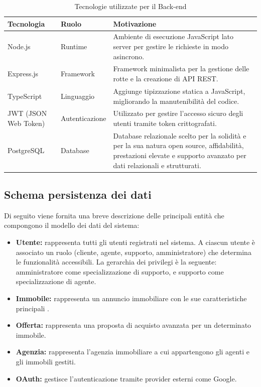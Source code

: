 \documentclass[a4paper,11pt]{article}
\renewcommand{\arraystretch}{1.18}
\begin{document}
\begin{table}[htbp]
\centering
\caption{Tecnologie utilizzate per il Back-end}
\vspace{0.5em}
\renewcommand{\arraystretch}{1.5}
\begin{tabularx}{\textwidth}{|l|l|X|}
\hline
\rowcolor[HTML]{010066} 
{\color[HTML]{EFEFEF} \textbf{Tecnologia}} & {\color[HTML]{FFFFFF} \textbf{Ruolo}} & {\color[HTML]{FFFFFF} \textbf{Motivazione}} \\ \hline

Node.js & Runtime & Ambiente di esecuzione JavaScript lato server per gestire le richieste in modo asincrono. \\ \hline

Express.js & Framework & Framework minimalista per la gestione delle rotte e la creazione di API REST. \\ \hline

TypeScript & Linguaggio & Aggiunge tipizzazione statica a JavaScript, migliorando la manutenibilità del codice. \\ \hline

JWT (JSON Web Token) & Autenticazione & Utilizzato per gestire l'accesso sicuro degli utenti tramite token crittografati. \\ \hline

PostgreSQL & Database & Database relazionale scelto per la solidità e per la sua natura open source, affidabilità, prestazioni elevate e supporto avanzato per dati relazionali e strutturati. \\ \hline
\end{tabularx}
\end{table}

\newpage
\subsection{Schema persistenza dei dati}


Di seguito viene fornita una breve descrizione delle principali entità che compongono il modello dei dati del sistema:

\begin{itemize}
    \item \textbf{Utente:} rappresenta tutti gli utenti registrati nel sistema. A ciascun utente è associato un ruolo (cliente, agente, supporto, amministratore) che determina le funzionalità accessibili. La gerarchia dei privilegi è la seguente: amministratore come specializzazione di supporto, e supporto come specializzazione di agente.
    \item \textbf{Immobile:} rappresenta un annuncio immobiliare con le sue caratteristiche principali .
    \item \textbf{Offerta:} rappresenta una proposta di acquisto avanzata per un determinato immobile.
    \item \textbf{Agenzia:} rappresenta l'agenzia immobiliare a cui appartengono gli agenti e gli immobili gestiti.
    \item \textbf{OAuth:} gestisce l'autenticazione tramite provider esterni come Google.
\end{itemize}
\end{document}
